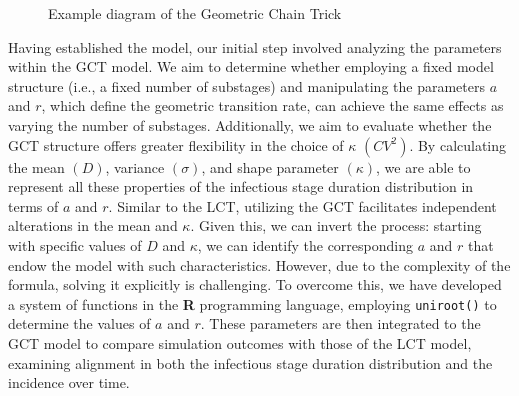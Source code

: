 \documentclass[12pt]{article}
\begin{document}
\begin{figure}[ht]
    \centering
    \caption{Example diagram of the Geometric Chain Trick}
    \label{GCTdiagram}
\end{figure}

Having established the model, our initial step involved analyzing the parameters within the GCT model. We aim to determine whether employing a fixed model structure (i.e., a fixed number of substages) and manipulating the parameters $a$ and $r$, which define the geometric transition rate, can achieve the same effects as varying the number of substages. Additionally, we aim to evaluate whether the GCT structure offers greater flexibility in the choice of $\kappa$ $(CV^2)$. By calculating the mean $(D)$, variance $(\sigma)$, and shape parameter $(\kappa)$, we are able to represent all these properties of the infectious stage duration distribution in terms of $a$ and $r$. Similar to the LCT, utilizing the GCT facilitates independent alterations in the mean and $\kappa$. Given this, we can invert the process: starting with specific values of $D$ and $\kappa$, we can identify the corresponding $a$ and $r$ that endow the model with such characteristics. However, due to the complexity of the formula, solving it explicitly is challenging. To overcome this, we have developed a system of functions in the \textbf{R} programming language, employing \verb|uniroot()| to determine the values of $a$ and $r$. These parameters are then integrated to the GCT model to compare simulation outcomes with those of the LCT model, examining alignment in both the infectious stage duration distribution and the incidence over time.
\end{document}
